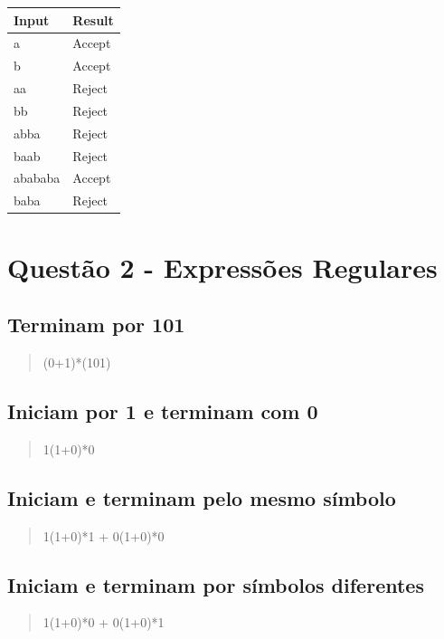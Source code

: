 \documentclass[11pt]{article}
\begin{document}
\begin{center}
\begin{tabular}{ll}
Input & Result\\
\hline
a & Accept\\
b & Accept\\
aa & Reject\\
bb & Reject\\
abba & Reject\\
baab & Reject\\
abababa & Accept\\
baba & Reject\\
\end{tabular}
\end{center}
\pagebreak

\section{Questão 2 - Expressões Regulares}
\label{sec:org47235f9}
\subsection{Terminam por 101}
\label{sec:orgf7dddd2}

\begin{quote}
(0+1)*(101)
\end{quote}

\subsection{Iniciam por 1 e terminam com 0}
\label{sec:org72abd86}

\begin{quote}
1(1+0)*0 
\end{quote}

\subsection{Iniciam e terminam pelo mesmo símbolo}
\label{sec:orgd8b3031}

\begin{quote}
1(1+0)*1 + 0(1+0)*0 
\end{quote}

\subsection{Iniciam e terminam por símbolos diferentes}
\label{sec:org952d3ca}

\begin{quote}
1(1+0)*0 + 0(1+0)*1 
\end{quote}
\end{document}

